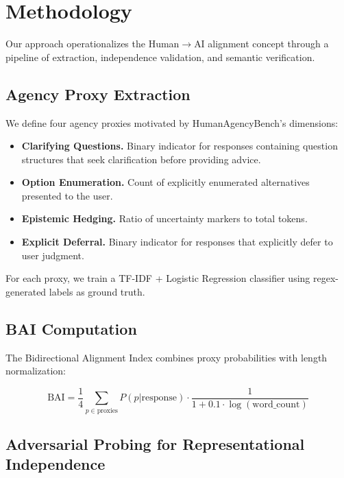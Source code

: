 \section{Methodology}

Our approach operationalizes the Human$\rightarrow$AI alignment concept through a pipeline of extraction, independence validation, and semantic verification.

\subsection{Agency Proxy Extraction}

We define four agency proxies motivated by HumanAgencyBench's dimensions:

\begin{itemize}
    \item \textbf{Clarifying Questions.} Binary indicator for responses containing question structures that seek clarification before providing advice.
    \item \textbf{Option Enumeration.} Count of explicitly enumerated alternatives presented to the user.
    \item \textbf{Epistemic Hedging.} Ratio of uncertainty markers to total tokens.
    \item \textbf{Explicit Deferral.} Binary indicator for responses that explicitly defer to user judgment.
\end{itemize}

For each proxy, we train a TF-IDF + Logistic Regression classifier using regex-generated labels as ground truth.

\subsection{BAI Computation}

The Bidirectional Alignment Index combines proxy probabilities with length normalization:

\begin{equation}
\text{BAI} = \frac{1}{4} \sum_{p \in \text{proxies}} P(p|\text{response}) \cdot \frac{1}{1 + 0.1 \cdot \log(\text{word\_count})}
\end{equation}

\subsection{Adversarial Probing for Representational Independence}

